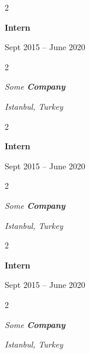 \documentclass[10pt, letterpaper]{article}
\newenvironment{twocolentry}[2][]{
    \onecolentry
    \def\secondColumn{#2}
    \setcolumnwidth{\fill, 4.5 cm}
    \begin{paracol}{2}
}{
    \switchcolumn \raggedleft \secondColumn
    \end{paracol}
    \endonecolentry
} %
\begin{document}
        \vspace{0.2 cm}

                \begin{twocolentry}{
                    Sept 2015 – June 2020
                }
                \textbf{Intern}
                \end{twocolentry}
            \begin{twocolentry}{
        \textit{Istanbul, Turkey}    }
            \textit{Some \textbf{Company}}
            \end{twocolentry}



        \vspace{0.2 cm}

                \begin{twocolentry}{
                    Sept 2015 – June 2020
                }
                \textbf{Intern}
                \end{twocolentry}
            \begin{twocolentry}{
        \textit{Istanbul, Turkey}    }
            \textit{Some \textbf{Company}}
            \end{twocolentry}



        \vspace{0.2 cm}

                \begin{twocolentry}{
                    Sept 2015 – June 2020
                }
                \textbf{Intern}
                \end{twocolentry}
            \begin{twocolentry}{
        \textit{Istanbul, Turkey}    }
            \textit{Some \textbf{Company}}
            \end{twocolentry}
\end{document}
